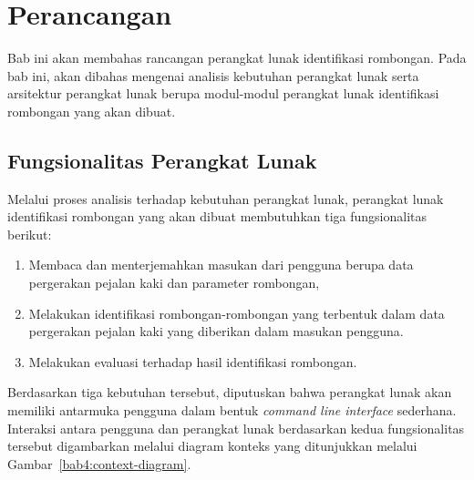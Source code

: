 \chapter{Perancangan}
\label{chap:perancangan}

Bab ini akan membahas rancangan perangkat lunak identifikasi rombongan. Pada bab ini, akan dibahas mengenai analisis kebutuhan perangkat lunak serta arsitektur perangkat lunak berupa modul-modul perangkat lunak identifikasi rombongan yang akan dibuat.

\iffalse

Sebelum melalui tahap implementasi, perangkat lunak perlu melalui proses perancangan perangkat lunak. Perancangan perangkat lunak merupakan sebuah proses untuk mengidentifikasi artefak-artefak dari perangkat lunak seperti modul, fungsi, kelas, serta artefak-artefak lainnya yang bertujuan untuk memenuhi kebutuhan perangkat lunak. Manfaat utama dari perancangan perangkat lunak adalah supaya perilaku perangkat lunak yang dihasilkan dapat lebih mudah diprediksi dan dikontrol sehingga perangkat lunak dapat lebih mudah dikembangkan dan diperbaiki di masa depan~\cite{budgen:04:software-design}.

\fi

\section{Fungsionalitas Perangkat Lunak}
\label{sec:functionality}

Melalui proses analisis terhadap kebutuhan perangkat lunak, perangkat lunak identifikasi rombongan yang akan dibuat membutuhkan tiga fungsionalitas berikut:

\begin{enumerate}
    \item Membaca dan menterjemahkan masukan dari pengguna berupa data pergerakan pejalan kaki dan parameter rombongan,
    \item Melakukan identifikasi rombongan-rombongan yang terbentuk dalam data pergerakan pejalan kaki yang diberikan dalam masukan pengguna.
    \item Melakukan evaluasi terhadap hasil identifikasi rombongan.
\end{enumerate}

Berdasarkan tiga kebutuhan tersebut, diputuskan bahwa perangkat lunak akan memiliki antarmuka pengguna dalam bentuk \textit{command line interface} sederhana. Interaksi antara pengguna dan perangkat lunak berdasarkan kedua fungsionalitas tersebut digambarkan melalui diagram konteks yang ditunjukkan melalui Gambar~\ref{bab4:context-diagram}.

